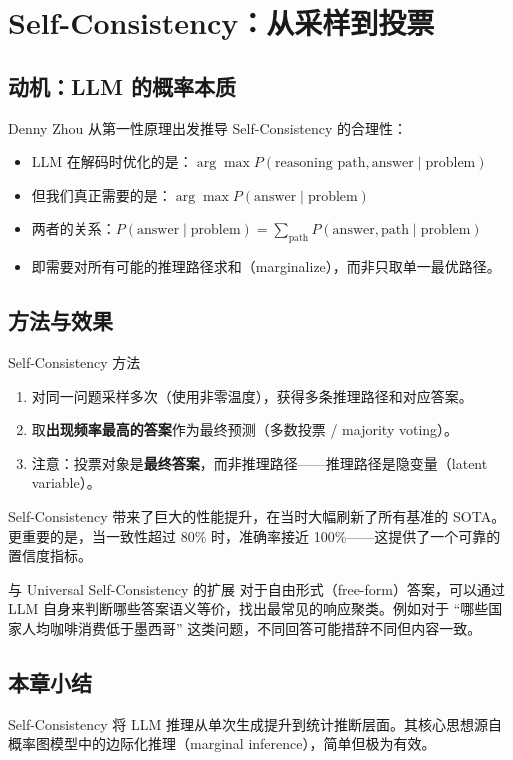 \section{Self-Consistency：从采样到投票}

\subsection{动机：LLM 的概率本质}

Denny Zhou 从第一性原理出发推导 Self-Consistency 的合理性：

\begin{itemize}
    \item LLM 在解码时优化的是：$\arg\max P(\text{reasoning path}, \text{answer} \mid \text{problem})$
    \item 但我们真正需要的是：$\arg\max P(\text{answer} \mid \text{problem})$
    \item 两者的关系：$P(\text{answer} \mid \text{problem}) = \sum_{\text{path}} P(\text{answer}, \text{path} \mid \text{problem})$
    \item 即需要对所有可能的推理路径求和（marginalize），而非只取单一最优路径。
\end{itemize}

\subsection{方法与效果}

\begin{importantbox}{Self-Consistency 方法}
\begin{enumerate}
    \item 对同一问题采样多次（使用非零温度），获得多条推理路径和对应答案。
    \item 取\textbf{出现频率最高的答案}作为最终预测（多数投票 / majority voting）。
    \item 注意：投票对象是\textbf{最终答案}，而非推理路径——推理路径是隐变量（latent variable）。
\end{enumerate}
\end{importantbox}

Self-Consistency 带来了巨大的性能提升，在当时大幅刷新了所有基准的 SOTA。更重要的是，当一致性超过 80\% 时，准确率接近 100\%——这提供了一个可靠的置信度指标。

\begin{knowledgebox}{与 Universal Self-Consistency 的扩展}
对于自由形式（free-form）答案，可以通过 LLM 自身来判断哪些答案语义等价，找出最常见的响应聚类。例如对于 ``哪些国家人均咖啡消费低于墨西哥'' 这类问题，不同回答可能措辞不同但内容一致。
\end{knowledgebox}

\subsection{本章小结}

Self-Consistency 将 LLM 推理从单次生成提升到统计推断层面。其核心思想源自概率图模型中的边际化推理（marginal inference），简单但极为有效。

